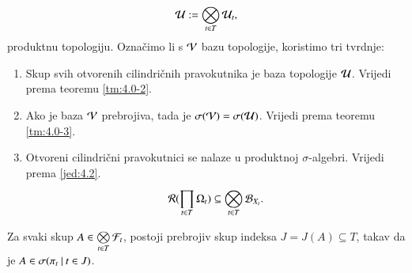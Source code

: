 \begin{rj}[\ref{zad:4.4}]
\begin{enumerate}
        \begin{equation*}
            \mathcal{U} := \bigotimes\limits_{t \in T}^{} \mathcal{U}_t,
        \end{equation*}
        produktnu topologiju.
        Ozna\v cimo li s $\mathcal{V}$ bazu topologije, koristimo tri tvrdnje:
        \begin{enumerate}[label=(\arabic*)]
            \item Skup svih otvorenih cilindri\v cnih pravokutnika je baza topologije $\mathcal{U}$.
            Vrijedi prema teoremu \ref{tm:4.0-2}.
            \item Ako je baza $\mathcal{V}$ prebrojiva, tada je $\sigma({\mathcal{V}}) = \sigma({\mathcal{U}})$.
            Vrijedi prema teoremu \ref{tm:4.0-3}.
            \item Otvoreni cilindri\v cni pravokutnici se nalaze u produktnoj $\sigma$-algebri.
            Vrijedi prema \eqref{jed:4.2}.
            \begin{equation*}
                \mathcal{R}({\prod\limits_{t \in T}^{} \Omega_t}) \subseteq \bigotimes\limits_{t \in T}^{} \mathcal{B}_{X_t}.
            \end{equation*}
        \end{enumerate}
    \end{enumerate}
\end{rj}

\begin{zad} \label{zad:4.6}
    Za svaki skup $A \in \bigotimes\limits_{t \in T}^{} \mathcal{F}_t$, postoji prebrojiv skup indeksa $J = J(A) \subseteq T$, takav da je $A \in \sigma({\pi_t} \: | \: {t \in J})$. 
\end{zad}


